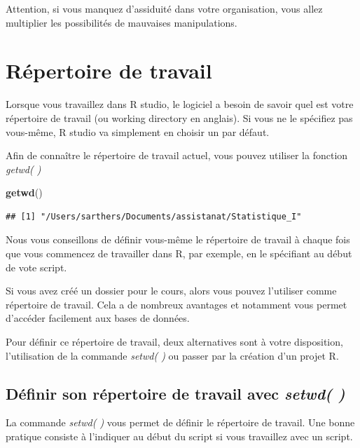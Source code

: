 \documentclass[
]{book}
\newenvironment{Shaded}{\begin{snugshade}}{\end{snugshade}}
\newcommand{\FunctionTok}[1]{\textcolor[rgb]{0.13,0.29,0.53}{\textbf{#1}}}
\newcommand{\NormalTok}[1]{#1}
\begin{document}
Attention, si vous manquez d'assiduité dans votre organisation, vous allez multiplier les possibilités de mauvaises manipulations.

\section{Répertoire de travail}\label{ruxe9pertoire-de-travail}

Lorsque vous travaillez dans R studio, le logiciel a besoin de savoir quel est votre répertoire de travail (ou working directory en anglais). Si vous ne le spécifiez pas vous-même, R studio va simplement en choisir un par défaut.

Afin de connaître le répertoire de travail actuel, vous pouvez utiliser la fonction \emph{getwd( )}

\begin{Shaded}
\begin{Highlighting}[]
\FunctionTok{getwd}\NormalTok{()}
\end{Highlighting}
\end{Shaded}

\begin{verbatim}
## [1] "/Users/sarthers/Documents/assistanat/Statistique_I"
\end{verbatim}

Nous vous conseillons de définir vous-même le répertoire de travail à chaque fois que vous commencez de travailler dans R, par exemple, en le spécifiant au début de vote script.

Si vous avez créé un dossier pour le cours, alors vous pouvez l'utiliser comme répertoire de travail. Cela a de nombreux avantages et notamment vous permet d'accéder facilement aux bases de données.

Pour définir ce répertoire de travail, deux alternatives sont à votre disposition, l'utilisation de la commande \emph{setwd( )} ou passer par la création d'un projet R.

\subsection{\texorpdfstring{Définir son répertoire de travail avec \emph{setwd( )}}{Définir son répertoire de travail avec setwd( )}}\label{duxe9finir-son-ruxe9pertoire-de-travail-avec-setwd}

La commande \emph{setwd( )} vous permet de définir le répertoire de travail. Une bonne pratique consiste à l'indiquer au début du script si vous travaillez avec un script.
\end{document}

